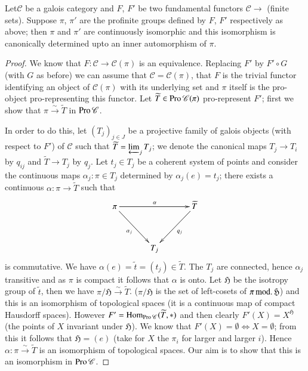 \begin{sublemma}\label{chap4-lem4.4.1.11}
Let\pageoriginale $\mathscr{C}$ be a galois category and $F$, $F'$ be
two fundamental functors $\mathscr{C}\to$ (finite sets). Suppose
$\pi$, $\pi'$ are the profinite groups defined by $F$, $F'$
respectively as above; then $\pi$ and $\pi'$ are continuously
isomorphic and this isomorphism is canonically determined upto an
inner automorphism of $\pi$.
\end{sublemma}

\begin{proof}
We know that $F:\mathscr{C}\to \mathscr{C}(\pi)$ is an
equivalence. Replacing $F'$ by $F'\circ G$ (with $G$ as before) we can
assume that $\mathscr{C}=\mathscr{C}(\pi)$, that $F$ is the trivial
functor identifying an object of $\mathscr{C}(\pi)$ with its
underlying set and $\pi$ itself is the pro-object pro-representing
this functor. Let $\widetilde{T}\in\operatorname{Pro} \mathscr{C}(\pi)$
pro-represent $F'$; first we show that
$\pi\xrightarrow{\sim}\widetilde{T}$ in $\operatorname{Pro}\mathscr{C}$.

In order to do this, let $(T_{j})_{j\in J}$ be a projective family of
galois objects (with respect to $F'$) of $\mathscr{C}$ such that
$\widetilde{T}=\varprojlim_{j}T_{j}$; we denote the canonical maps
$T_{j}\to T_{i}$ by $q_{ij}$ and $\widetilde{T}\to T_{j}$ by
$q_{j}$. Let $t_{j}\in T_{j}$ be a coherent system of points and
consider the continuous maps $\alpha_{j}:\pi\in T_{j}$ determined by
$\alpha_{j}(e)=t_{j}$; there exists a continuous $\alpha:\pi\to
\widetilde{T}$ such that
\[
\xymatrix@=1.2cm{
\pi\ar[rr]^{\alpha}\ar[dr]_{\alpha_{j}} & & \widetilde{T}\ar[dl]^{q_{j}}\\
& T_{j} & 
}
\]
is commutative. We have $\alpha(e)=\widetilde{t}=(t_{j})\in
\widetilde{T}$. The $T_{j}$ are connected, hence\pageoriginale
$\alpha_{j}$ transitive and as $\pi$ is compact it follows that
$\alpha$ is onto. Let $\mathfrak{H}$ be the isotropy group of
$\widetilde{t}$, then we have
$\pi/\mathfrak{H}\xrightarrow{\sim}\widetilde{T}$. ($\pi/\mathfrak{H}$
is the set of left-cosets of $\pi\text{\,mod.\,}\mathfrak{H}$) and
this is an isomorphism of topological spaces (it is a continuous map
of compact Hausdorff spaces). However
$F'=\operatorname{Hom}_{\operatorname{Pro}\mathscr{C}}(\widetilde{T},*)$ and then clearly
$F'(X)=X^{\mathfrak{H}}$ (the points of $X$ invariant under
$\mathfrak{H}$). We know that $F'(X)=\emptyset\Leftrightarrow
X=\emptyset$; from this it follows that $\mathfrak{H}=(e)$ (take for
$X$ the $\pi_{i}$ for larger and larger $i$). Hence
$\alpha:\pi\xrightarrow{\sim}\widetilde{T}$ is an isomorphism of
topological spaces. Our aim is to show that this is an isomorphism in
$\operatorname{Pro} \mathscr{C}$.


\end{proof}
